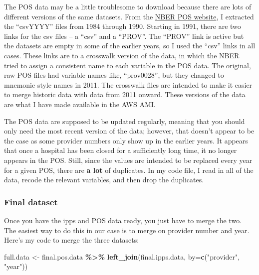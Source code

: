 \documentclass[
  12pt,
]{article}
\newenvironment{Shaded}{\begin{snugshade}}{\end{snugshade}}
\newcommand{\DataTypeTok}[1]{\textcolor[rgb]{0.13,0.29,0.53}{#1}}
\newcommand{\KeywordTok}[1]{\textcolor[rgb]{0.13,0.29,0.53}{\textbf{#1}}}
\newcommand{\NormalTok}[1]{#1}
\newcommand{\OperatorTok}[1]{\textcolor[rgb]{0.81,0.36,0.00}{\textbf{#1}}}
\newcommand{\StringTok}[1]{\textcolor[rgb]{0.31,0.60,0.02}{#1}}
\begin{document}
The POS data may be a little troublesome to download because there are lots of different versions of the same datasets. From the \href{https://data.nber.org/data/provider-of-services.html}{NBER POS website}, I extracted the ``csvYYYY'' files from 1984 through 1990. Starting in 1991, there are two links for the csv files -- a ``csv'' and a ``PROV''. The ``PROV'' link is active but the datasets are empty in some of the earlier years, so I used the ``csv'' links in all cases. These links are to a crosswalk version of the data, in which the NBER tried to assign a consistent name to each variable in the POS data. The original, raw POS files had variable names like, ``prov0028'', but they changed to mnemonic style names in 2011. The crosswalk files are intended to make it easier to merge historic data with data from 2011 onward. These versions of the data are what I have made available in the AWS AMI.

The POS data are supposed to be updated regularly, meaning that you should only need the most recent version of the data; however, that doesn't appear to be the case as some provider numbers only show up in the earlier years. It appears that once a hospital has been closed for a sufficiently long time, it no longer appears in the POS. Still, since the values are intended to be replaced every year for a given POS, there are \textbf{a lot} of duplicates. In my code file, I read in all of the data, recode the relevant variables, and then drop the duplicates.

\hypertarget{final-dataset}{%
\subsubsection{Final dataset}\label{final-dataset}}

Once you have the ipps and POS data ready, you just have to merge the two. The easiest way to do this in our case is to merge on provider number and year. Here's my code to merge the three datasets:


\begin{Shaded}
\begin{Highlighting}[]
\NormalTok{full.data \textless{}{-}}\StringTok{ }\NormalTok{final.pos.data }\OperatorTok{\%\textgreater{}\%}
\StringTok{  }\KeywordTok{left\_join}\NormalTok{(final.ipps.data, }\DataTypeTok{by=}\KeywordTok{c}\NormalTok{(}\StringTok{"provider"}\NormalTok{, }\StringTok{"year"}\NormalTok{))}
\end{Highlighting}
\end{Shaded}
\end{document}
